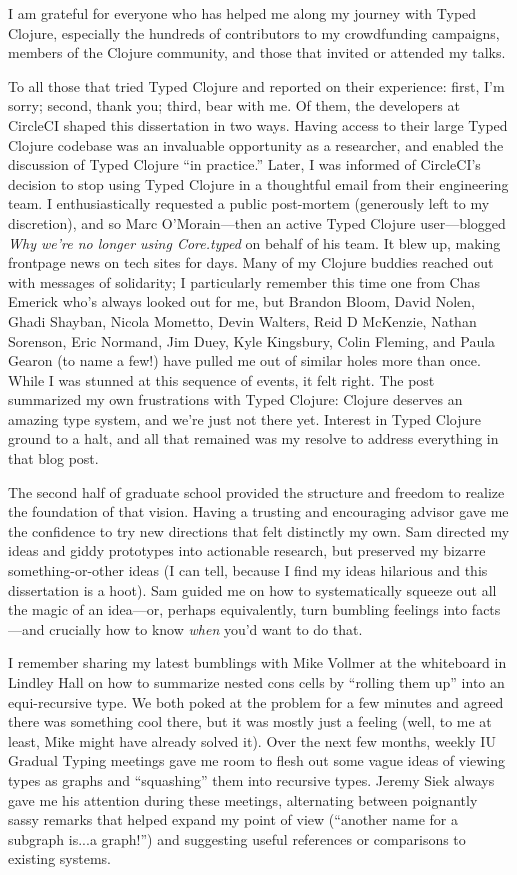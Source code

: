 I am grateful for everyone who has helped me along my journey
with Typed Clojure, especially the hundreds of
contributors to my crowdfunding campaigns, members of the
Clojure community, and those that invited or attended my talks.

To all those that tried Typed Clojure and reported on their experience:
first, I'm sorry; second, thank you; third, bear with me.
Of them, the developers at CircleCI shaped this dissertation in two ways.
Having access to their large Typed Clojure
codebase was an invaluable opportunity as a researcher, and enabled the
discussion of Typed Clojure ``in practice.''
Later, I was informed of CircleCI's decision to stop using Typed Clojure
in a thoughtful email from their engineering team.
I enthusiastically requested a public post-mortem (generously left
to my discretion), and so
Marc O'Morain---then an active Typed Clojure user---blogged \emph{Why we're no longer using Core.typed}
on behalf of his team.
It blew up, making frontpage news on tech sites for days.
Many of my Clojure buddies reached out with messages of solidarity; I particularly remember 
this time one from Chas Emerick who's always looked out for me, but Brandon Bloom, David Nolen,
Ghadi Shayban, Nicola Mometto, Devin Walters, Reid D McKenzie, Nathan Sorenson, Eric
Normand, Jim Duey, Kyle Kingsbury, Colin Fleming, and Paula Gearon (to name a few!)
have pulled me out of similar holes more than once.
While I was stunned at this sequence of events, it felt right.
The post summarized my own frustrations with Typed Clojure: Clojure
deserves an amazing type system, and we're just not there yet.
Interest in Typed Clojure ground to a halt,
and all that remained was my resolve to address everything in that blog
post.

The second half of graduate school provided the structure and freedom to
realize the foundation of that vision. Having a trusting and encouraging advisor
gave me the confidence to try new directions that felt distinctly my own.
Sam directed my ideas and giddy prototypes into actionable research,
but preserved my bizarre something-or-other ideas (I can tell, because
I find my ideas hilarious and this dissertation is a hoot).
Sam guided me on how to systematically squeeze out all the magic of an idea---or, perhaps
equivalently, turn bumbling feelings into facts---and crucially how to know \emph{when} you'd
want to do that.

I remember sharing my latest bumblings with Mike Vollmer at the whiteboard in Lindley Hall
on how to summarize nested cons cells by ``rolling them up'' into an equi-recursive type.
We both poked at the problem for a few minutes and agreed there was something cool there,
but it was mostly just a feeling (well, to me at least, Mike might have already solved it).
Over the next few months, weekly IU Gradual Typing meetings
gave me room to flesh out some vague ideas of viewing types as graphs and ``squashing''
them into recursive types.
Jeremy Siek always gave me his attention during these meetings,
alternating between poignantly sassy remarks that helped expand my point of view
(``another name for a subgraph is...a graph!'')
and suggesting useful references or comparisons to existing systems.

